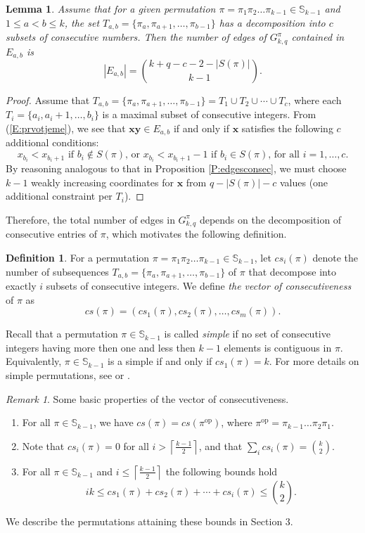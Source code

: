 \documentclass{birkjour}
\newtheorem{lem}[thm]{Lemma}
\theoremstyle{definition}
\newtheorem{defn}[thm]{Definition}
\theoremstyle{remark}
\newtheorem{rem}[thm]{Remark}
\numberwithin{equation}{section}
\begin{document}
\begin{lem}\label{L:Eab} Assume that for a given permutation
$\pi=\pi_1\pi_2\ldots\pi_{k-1}\in \mathbb{S}_{k-1}$ and $1\leq
a<b\leq k$, the set $T_{a,b}=\{\pi_a,\pi_{a+1},\ldots,\pi_{b-1}\}$
has a decomposition into $c$ subsets of consecutive numbers. Then
the number of edges of $G^\pi_{k,q}$ contained in
 $E_{a,b}$ is
 $$|E_{a,b}|={k+q-c-2-|S(\pi)|\choose k-1}.$$
\end{lem}
\begin{proof}
Assume that $T_{a,b}=\{\pi_a, \pi_{a+1},\ldots,\pi_{b-1}\}=T_1\cup
T_2\cup\cdots\cup T_c$, where each $T_i = \{a_i,
a_i+1,\ldots,b_i\}$ is a maximal subset of consecutive integers.
 From (\ref{E:prvotjeme}), we see
that $\mathbf{xy} \in E_{a,b}$ if and only if $\mathbf{x}$
satisfies the following $c$ additional conditions:
$$ x_{b_i}<x_{b_i+1}\textrm{ if }b_i \notin S(\pi)
\textrm{,  or } x_{b_i}<x_{b_i+1}-1\textrm{ if }b_i \in S(\pi)
\textrm{, for all }i=1,\ldots,c.$$ By reasoning analogous to that
in Proposition \ref{P:edgesconsec}, we must choose $k-1$ weakly
increasing coordinates for $\mathbf{x}$ from $q-|S(\pi)|-c$ values
(one additional constraint per  $T_{i}$).
\end{proof}
Therefore, the total number of edges in $G_{k,q}^\pi$ depends on
the decomposition of consecutive entries of $\pi$, which motivates
the following definition.
\begin{defn}
For a permutation $\pi=\pi_1\pi_2\ldots\pi_{k-1}\in
\mathbb{S}_{k-1}$, let $cs_i(\pi)$ denote the number of
subsequences $T_{a,b}=\{\pi_a, \pi_{a+1},\ldots,\pi_{b-1}\}$ of
$\pi$ that decompose into exactly $i$ subsets of consecutive
integers. We define \emph{the vector of consecutiveness} of $\pi$
as
$$cs(\pi)=\left(cs_1(\pi),cs_2(\pi),\ldots,
cs_{m}(\pi)\right).$$
\end{defn}
Recall that a permutation $\pi \in \mathbb{S}_{k-1}$ is called
\emph{simple} if no set of consecutive integers having more then
one and less then $k-1$ elements is contiguous in $\pi$. Equivalently,
$\pi\in \mathbb{S}_{k-1}$ is a simple if and only if
$cs_1(\pi)=k$. For more details on simple permutations, see
\cite{Bri} or \cite{AA}.
\begin{rem} Some basic properties of the vector of consecutiveness.
\begin{enumerate}
    \item For all $\pi\in \mathbb{S}_{k-1}$,
     we have $cs(\pi)=cs(\pi^{\mathrm{op}})$, where $\pi^{\mathrm{op}}=
    \pi_{k-1}\ldots\pi_2\pi_1$.
    \item Note that $cs_i(\pi)=0$ for all
$i>\left\lceil\frac{k-1}{2}\right\rceil$, and that $\sum_{i}
cs_i(\pi)={k \choose 2}$.
    \item For all $\pi\in \mathbb{S}_{k-1}$ and
    $i\leq\left\lceil\frac{k-1}{2}\right\rceil$
    the following bounds hold \begin{equation}\label{E:boundsforcs}
ik\leq cs_1(\pi)+cs_2(\pi)+\cdots+cs_i(\pi)\leq {k\choose 2}.
\end{equation}
\end{enumerate}
We describe the permutations attaining these bounds in Section 3.
\end{rem}
\end{document}
